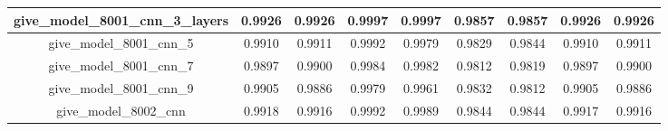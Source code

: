\begin{table}[!h]
\begin{tabular} {|c|c|c|c|c|c|c|c|c| }
        give\_model\_8001\_cnn\_3\_layers & 0.9926                        & 0.9926                         & 0.9997                      & 0.9997                  & 0.9857 & 0.9857 & 0.9926 & 0.9926 \\ \hline
        give\_model\_8001\_cnn\_5         & 0.9910                        & 0.9911                         & 0.9992                      & 0.9979                  & 0.9829 & 0.9844 & 0.9910 & 0.9911 \\ \hline
        give\_model\_8001\_cnn\_7         & 0.9897                        & 0.9900                         & 0.9984                      & 0.9982                  & 0.9812 & 0.9819 & 0.9897 & 0.9900 \\ \hline
        give\_model\_8001\_cnn\_9         & 0.9905                        & 0.9886                         & 0.9979                      & 0.9961                  & 0.9832 & 0.9812 & 0.9905 & 0.9886 \\ \hline
        give\_model\_8002\_cnn            & 0.9918                        & 0.9916                         & 0.9992                      & 0.9989                  & 0.9844 & 0.9844 & 0.9917 & 0.9916 \\ \hline
    \end{tabular}
\end{table}



